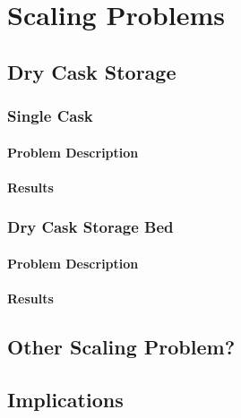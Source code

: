 \chapter{Scaling Problems}

\section{Dry Cask Storage}
\subsection{Single Cask}
\subsubsection{Problem Description}
\subsubsection{Results}
\subsection{Dry Cask Storage Bed}
\subsubsection{Problem Description}
\subsubsection{Results}
\section{Other Scaling Problem?}
\section{Implications}

